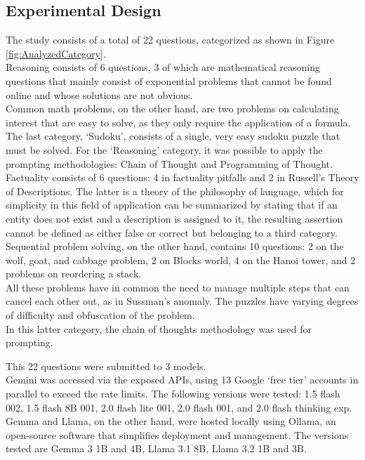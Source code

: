 \documentclass[12pt]{article}
\begin{document}
    
    \subsection{Experimental Design} 
    The study consists of a total of 22 questions, categorized as shown in Figure \ref{fig:AnalyzedCategory}.\\
Reasoning consists of 6 questions, 3 of which are mathematical reasoning questions that mainly consist of exponential problems that cannot be found online and whose solutions are not obvious.\\
Common math problems, on the other hand, are two problems on calculating interest that are easy to solve, as they only require the application of a formula.\\
The last category, ‘Sudoku’, consists of a single, very easy sudoku puzzle that must be solved.
For the ‘Reasoning’ category, it was possible to apply the prompting methodologies: Chain of Thought and Programming of Thought.\\
Factuality consists of 6 questions: 4 in factuality pitfalls and 2 in Russell's Theory of Descriptions. The latter is a theory of the philosophy of language, which for simplicity in this field of application can be summarized by stating that if an entity does not exist and a description is assigned to it, the resulting assertion cannot be defined as either false or correct but belonging to a third category.\\
Sequential problem solving, on the other hand, contains 10 questions: 2 on the wolf, goat, and cabbage problem, 2 on Blocks world, 4 on the Hanoi tower, and 2 problems on reordering a stack.\\
All these problems have in common the need to manage multiple steps that can cancel each other out, as in Sussman's anomaly. The puzzles have varying degrees of difficulty and obfuscation of the problem.\\
In this latter category, the chain of thoughts methodology was used for prompting.
    
    This 22 questions were submitted to 3 models. \\
Gemini was accessed via the exposed APIs, using 13 Google ‘free tier’ accounts in parallel to exceed the rate limits. The following versions were tested: 1.5 flash 002, 1.5 flash 8B 001, 2.0 flash lite 001, 2.0 flash 001, and 2.0 flash thinking exp.\\
Gemma and Llama, on the other hand, were hosted locally using Ollama, an open-source software that simplifies deployment and management. The versions tested are Gemma 3 1B and 4B, Llama 3.1 8B, Llama 3.2 1B and 3B.
\end{document}

